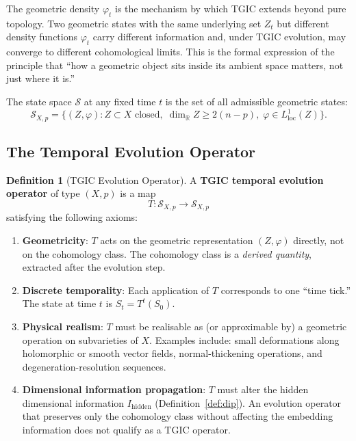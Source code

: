 \documentclass[11pt,a4paper]{article}
\theoremstyle{definition}
\newtheorem{definition}{Definition}[section]
\theoremstyle{plain}
\newcommand{\RR}{\mathbb{R}}
\begin{document}
The geometric density $\varphi_t$ is the mechanism by which TGIC extends beyond pure topology. Two geometric states with the same underlying set $Z_t$ but different density functions $\varphi_t$ carry different information and, under TGIC evolution, may converge to different cohomological limits. This is the formal expression of the principle that ``how a geometric object sits inside its ambient space matters, not just where it is.''

The state space $\mathcal{S}$ at any fixed time $t$ is the set of all admissible geometric states:
\begin{equation}\label{eq:state-space}
\mathcal{S}_{X,p} = \bigl\{(Z, \varphi) : Z \subset X \text{ closed},\; \dim_{\RR} Z \geq 2(n-p),\; \varphi \in L^1_{\mathrm{loc}}(Z)\bigr\}.
\end{equation}

\subsection{The Temporal Evolution Operator}

\begin{definition}[TGIC Evolution Operator]\label{def:evo}
A \textbf{TGIC temporal evolution operator} of type $(X, p)$ is a map
\begin{equation}\label{eq:evo}
T : \mathcal{S}_{X,p} \to \mathcal{S}_{X,p}
\end{equation}
satisfying the following axioms:
\begin{enumerate}[label=(E\arabic*)]
\item \textbf{Geometricity}: $T$ acts on the geometric representation $(Z, \varphi)$ directly, not on the cohomology class. The cohomology class is a \emph{derived quantity}, extracted after the evolution step.
\item \textbf{Discrete temporality}: Each application of $T$ corresponds to one ``time tick.'' The state at time $t$ is $S_t = T^t(S_0)$.
\item \textbf{Physical realism}: $T$ must be realisable as (or approximable by) a geometric operation on subvarieties of $X$. Examples include: small deformations along holomorphic or smooth vector fields, normal-thickening operations, and degeneration-resolution sequences.
\item \textbf{Dimensional information propagation}: $T$ must alter the hidden dimensional information $I_{\mathrm{hidden}}$ (Definition~\ref{def:dip}). An evolution operator that preserves only the cohomology class without affecting the embedding information does not qualify as a TGIC operator.
\end{enumerate}
\end{definition}
\end{document}
